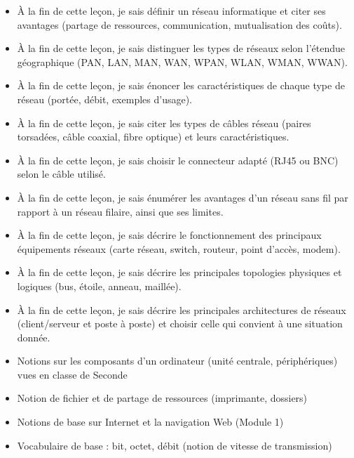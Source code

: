 \documentclass[11pt]{article}
\begin{document}
\begin{objectifs}
\begin{itemize}
\item À la fin de cette leçon, je sais définir un réseau informatique et citer ses avantages (partage de ressources, communication, mutualisation des coûts).
\item À la fin de cette leçon, je sais distinguer les types de réseaux selon l'étendue géographique (PAN, LAN, MAN, WAN, WPAN, WLAN, WMAN, WWAN).
\item À la fin de cette leçon, je sais énoncer les caractéristiques de chaque type de réseau (portée, débit, exemples d'usage).
\item À la fin de cette leçon, je sais citer les types de câbles réseau (paires torsadées, câble coaxial, fibre optique) et leurs caractéristiques.
\item À la fin de cette leçon, je sais choisir le connecteur adapté (RJ45 ou BNC) selon le câble utilisé.
\item À la fin de cette leçon, je sais énumérer les avantages d'un réseau sans fil par rapport à un réseau filaire, ainsi que ses limites.
\item À la fin de cette leçon, je sais décrire le fonctionnement des principaux équipements réseaux (carte réseau, switch, routeur, point d'accès, modem).
\item À la fin de cette leçon, je sais décrire les principales topologies physiques et logiques (bus, étoile, anneau, maillée).
\item À la fin de cette leçon, je sais décrire les principales architectures de réseaux (client/serveur et poste à poste) et choisir celle qui convient à une situation donnée.
\end{itemize}
\end{objectifs}

\begin{prerequis}
\begin{itemize}
\item Notions sur les composants d'un ordinateur (unité centrale, périphériques) vues en classe de Seconde
\item Notion de fichier et de partage de ressources (imprimante, dossiers)
\item Notions de base sur Internet et la navigation Web (Module 1)
\item Vocabulaire de base : bit, octet, débit (notion de vitesse de transmission)
\end{itemize}
\end{prerequis}
\end{document}
